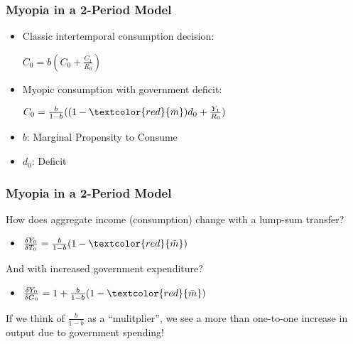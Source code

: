 \documentclass{beamer}
\begin{document}

\begin{frame}
	\frametitle{Myopia in a 2-Period Model}
	\begin{itemize}
		\item Classic intertemporal consumption decision:\\
		\vspace{8pt}
		\begin{center}
			$C_{0}=b(C_{0}+\frac {C_{1}}{R_{0}})$
		\end{center}
		\vspace{8pt}
		\item Myopic consumption with government deficit:\\
		\vspace{8pt}
		\begin{center}
			$C_{0}=\frac {b}{1-b}((1- \textcolor{red}{\bar m})d_{0}+\frac {Y_{1}}{R_{0}})$
	\end{center}
	\end{itemize}
	\vspace{8pt}
	\begin{itemize}
		\item $b$: Marginal Propensity to Consume
		\item $d_{0}$: Deficit
	\end{itemize}
\end{frame}


\begin{frame}
\frametitle{Myopia in a 2-Period Model}
	How does aggregate income (consumption) change with a lump-sum transfer?
	\vspace{8pt}
	\begin{itemize}
			\item $\frac{\delta Y_{0}}{\delta T_{0}}=\frac{b}{1-b}(1-\textcolor{red}{\bar m})$
	\end{itemize}
	\vspace{8pt}
	And with increased government expenditure?
	\vspace{8pt}
	\begin{itemize}
			\item $\frac{\delta Y_{0}}{\delta G_{0}}=1+\frac{b}{1-b}(1-\textcolor{red}{\bar m})$
			\vspace{10pt}
	\end{itemize}
	If we think of $\frac{b}{1-b}$ as a ``mulitplier'', we see a more than one-to-one increase in output due to government spending!
\end{frame}
\end{document}
